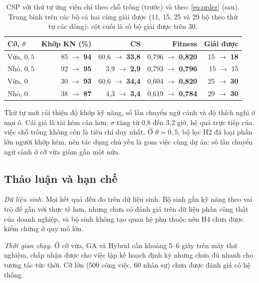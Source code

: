 \documentclass{IEEEtran}
\begin{document}
\begin{table}[t]
\centering
\caption{CSP với thứ tự ứng viên chỉ theo chỗ trống (trước) và theo~\eqref{eq:order} (sau). Trung bình trên các bộ cả hai cùng giải được (11, 15, 25 và 29 bộ theo thứ tự các dòng); cột cuối là số bộ giải được trên 30.}
\label{tab:order}
\setlength{\tabcolsep}{2.6pt}
\begin{tabular}{lrrrr}
\toprule
Cỡ, $\theta$ & Khớp KN (\%) & CS & Fitness & Giải được \\
\midrule
Vừa, $0{,}5$ & 85 $\rightarrow$ \textbf{94} & 60,6 $\rightarrow$ \textbf{33,8} & 0,796 $\rightarrow$ \textbf{0,820} & 15 $\rightarrow$ \textbf{18} \\
Nhỏ, $0{,}5$ & 92 $\rightarrow$ \textbf{95} & 3,9 $\rightarrow$ \textbf{2,9} & 0,793 $\rightarrow$ \textbf{0,796} & 15 $\rightarrow$ 15 \\
Vừa, $0$ & 30 $\rightarrow$ \textbf{93} & 60,6 $\rightarrow$ \textbf{34,4} & 0,604 $\rightarrow$ \textbf{0,820} & 25 $\rightarrow$ \textbf{30} \\
Nhỏ, $0$ & 38 $\rightarrow$ \textbf{87} & 4,3 $\rightarrow$ \textbf{3,4} & 0,619 $\rightarrow$ \textbf{0,784} & 29 $\rightarrow$ \textbf{30} \\
\bottomrule
\end{tabular}
\end{table}

Thứ tự mới cải thiện độ khớp kỹ năng, số lần chuyển ngữ cảnh và độ thích nghi ở mọi ô. Cái giá là tải kém cân hơn: $\sigma$ tăng từ 0,8 đến 3,2 giờ, hệ quả trực tiếp của việc chỗ trống không còn là tiêu chí duy nhất. Ở $\theta=0{,}5$, bộ lọc H2 đã loại phần lớn người khớp kém, nên tác dụng chủ yếu là gom việc cùng dự án: số lần chuyển ngữ cảnh ở cỡ vừa giảm gần một nửa.

\subsection{Thảo luận và hạn chế}

\textit{Dữ liệu sinh.} Mọi kết quả đều đo trên dữ liệu sinh. Bộ sinh gắn kỹ năng theo vai trò để gần với thực tế hơn, nhưng chưa có đánh giá trên dữ liệu phân công thật của doanh nghiệp, và bộ sinh không tạo quan hệ phụ thuộc nên H4 chưa được kiểm chứng ở quy mô lớn.

\textit{Thời gian chạy.} Ở cỡ vừa, GA và Hybrid cần khoảng 5--6 giây trên máy thử nghiệm, chấp nhận được cho việc lập kế hoạch định kỳ nhưng chưa đủ nhanh cho tương tác tức thời. Cỡ lớn (500 công việc, 60 nhân sự) chưa được đánh giá có hệ thống.
\end{document}
